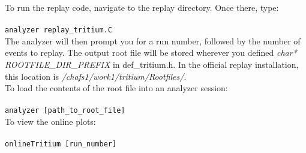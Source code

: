 \documentclass{report}
\begin{document}
To run the replay code, navigate to the replay directory. Once there, type:
\\\\
\texttt{analyzer replay\_tritium.C}
\\

The analyzer will then prompt you for a run number, followed by the number of events to replay. The output root file will be stored wherever you defined \textit{char* ROOTFILE\_DIR\_PREFIX} in def\_tritium.h. In the official replay installation, this location is \textit{/chafs1/work1/tritium/Rootfiles/}.
\\

To load the contents of the root file into an analyzer session:
\\\\
\texttt{analyzer [path\_to\_root\_file]}
\\

To view the online plots:
\\\\
\texttt{onlineTritium [run\_number]}
\\\\
\end{document}
